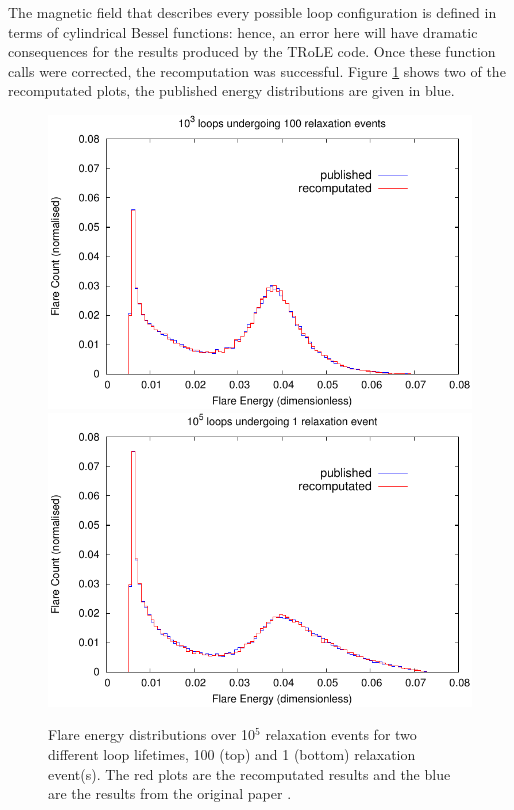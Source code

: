 The magnetic field that describes every possible loop configuration is defined in terms of cylindrical Bessel functions: hence, an error here will have dramatic consequences for the results produced by the TRoLE code. Once these function calls were corrected, the recomputation was successful. Figure \ref{fig_recomp_grp3_exp2} shows two of the recomputated plots, the published energy distributions \cite{bareford2010nanoflare} are given in blue.
\begin{figure}
\begin{minipage}{\linewidth} 
  \center
  \includegraphics{../Group_3/wrpf_rx10e5_lle2}\\
  \vspace{5pt}
  \includegraphics[scale=0.001]{../Group_3/wrpf_rx10e5_lle0}
  \caption{\small{Flare energy distributions over 10$^5$ relaxation events for two different loop lifetimes, 100 (top) and 1 (bottom) relaxation event(s). The red plots are the recomputated results and the blue are the results from the original paper \cite{bareford2010nanoflare}.}}
  \label{fig_recomp_grp3_exp2}
\end{minipage} 
\end{figure}
